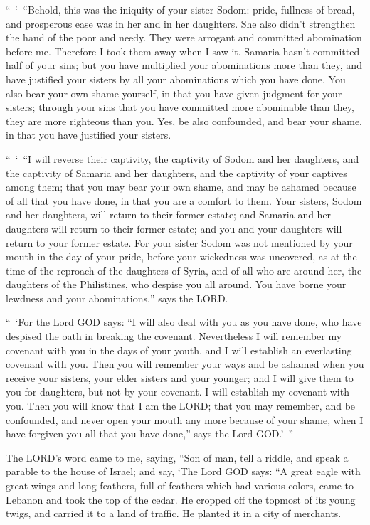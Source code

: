 \myverse{}“ ‘ “Behold, this was the iniquity of your sister Sodom: pride,
fullness of bread, and prosperous ease was in her and in her daughters. She also didn’t strengthen the
hand of the poor and needy.
\myverse{}They were arrogant and committed abomination before me. Therefore I took
them away when I saw it.
\myverse{}Samaria hasn’t committed half of your sins; but you have multiplied your
abominations more than they, and have justified your sisters by all your abominations which you have done.
\myverse{}You also bear your own shame yourself, in that you have given judgment for
your sisters; through your sins that you have committed more abominable than they, they are more righteous
than you. Yes, be also confounded, and bear your shame, in that you have justified your sisters.

\myverse{}“ ‘ “I will reverse their captivity, the captivity of Sodom and
her daughters, and the captivity of Samaria and her daughters, and the captivity of your captives among
them;
\myverse{}that you may bear your own shame, and may be ashamed because of all that
you have done, in that you are a comfort to them.
\myverse{}Your sisters, Sodom and her daughters, will return to their former estate;
and Samaria and her daughters will return to their former estate; and you and your daughters will return
to your former estate.
\myverse{}For your sister Sodom was not mentioned by your mouth in the day of your
pride,
\myverse{}before your wickedness was uncovered, as at the time of the reproach of the
daughters of Syria, and of all who are around her, the daughters of the Philistines, who despise you all
around.
\myverse{}You have borne your lewdness and your abominations,” says the LORD.

\myverse{}“ ‘For the Lord GOD says: “I will also deal with you as you have
done, who have despised the oath in breaking the covenant.
\myverse{}Nevertheless I will remember my covenant with you in the days of your youth,
and I will establish an everlasting covenant with you.
\myverse{}Then you will remember your ways and be ashamed when you receive your sisters,
your elder sisters and your younger; and I will give them to you for daughters, but not by your covenant.
\myverse{}I will establish my covenant with you. Then you will know that I am the LORD;
\myverse{}that you may remember, and be confounded, and never open your mouth any more
because of your shame, when I have forgiven you all that you have done,” says the Lord GOD.’ ”


\mychapter{} \myverse*{}The LORD’s word came to me, saying,
\myverse{}“Son of man, tell a riddle, and speak a parable to the house of Israel;
\myverse{}and say, ‘The Lord GOD says: “A great eagle with great wings and long feathers,
full of feathers which had various colors, came to Lebanon and took the top of the cedar.
\myverse{}He cropped off the topmost of its young twigs, and carried it to a land of
traffic. He planted it in a city of merchants.

